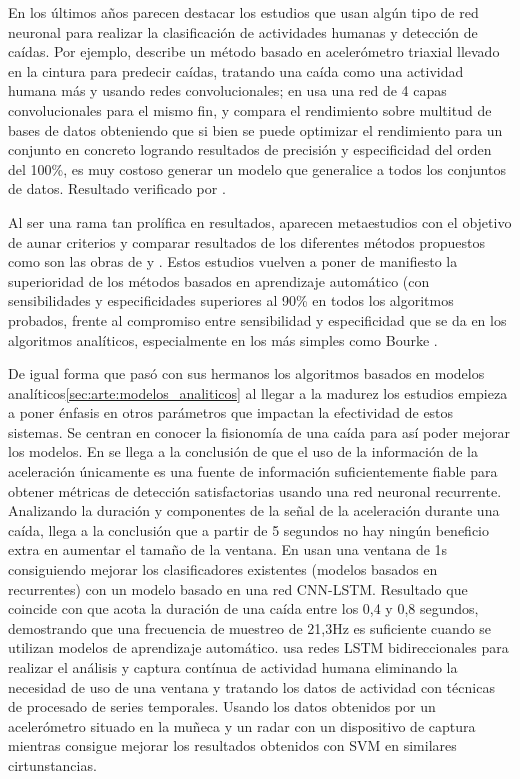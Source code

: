 En los últimos años parecen destacar los estudios que usan algún tipo de red neuronal \cite{Musci2020,Shi2020,Casilari2020,Liu2020} para realizar la clasificación de actividades humanas y detección de caídas. Por ejemplo,  describe un método basado en acelerómetro triaxial llevado en la cintura para predecir caídas, tratando una caída como una actividad humana más y usando redes convolucionales; en  usa una red de 4 capas convolucionales para el mismo fin, y compara el rendimiento sobre multitud de bases de datos obteniendo que si bien se puede optimizar el rendimiento para un conjunto en concreto logrando resultados de precisión y especificidad del orden del 100\%, es muy costoso generar un modelo que generalice a todos los conjuntos de datos. Resultado verificado por .

Al ser una rama tan prolífica en resultados, aparecen metaestudios con el objetivo de aunar criterios y comparar resultados de los diferentes métodos propuestos como son las obras de  y . Estos estudios vuelven a poner de manifiesto la superioridad de los métodos basados en aprendizaje automático (con sensibilidades y especificidades superiores al 90\% en todos los algoritmos probados, frente al compromiso entre sensibilidad y especificidad que se da en los algoritmos analíticos, especialmente en los más simples como Bourke \cite{Aziz2017}.

De igual forma que pasó con sus hermanos los algoritmos basados en modelos analíticos\ref{sec:arte:modelos_analiticos} al llegar a la madurez los estudios empieza a poner énfasis en otros parámetros que impactan la efectividad de estos sistemas. Se centran en conocer la fisionomía de una caída para así poder mejorar los modelos. En \cite[p.~6]{Musci2020} se llega a la conclusión de que el uso de la información de la aceleración únicamente es una fuente de información suficientemente fiable para obtener métricas de detección satisfactorias usando una red neuronal recurrente. Analizando la duración y componentes de la señal de la aceleración durante una caída,  llega a la conclusión que a partir de 5 segundos no hay ningún beneficio extra en aumentar el tamaño de la ventana. En \cite[p.~59]{Hassan2019} usan una ventana de 1s consiguiendo mejorar los clasificadores existentes (modelos basados en recurrentes) con un modelo basado en una red CNN-LSTM. Resultado que coincide con \cite[p.~2]{Liu2018} que acota la duración de una caída entre los 0,4 y 0,8 segundos, demostrando que una frecuencia de muestreo de 21,3Hz es suficiente cuando se utilizan modelos de aprendizaje automático.  usa redes LSTM bidireccionales para realizar el análisis y captura contínua de actividad humana eliminando la necesidad de uso de una ventana y tratando los datos de actividad con técnicas de procesado de series temporales. Usando los datos obtenidos por un acelerómetro situado en la muñeca y un radar con un dispositivo de captura  mientras consigue mejorar los resultados obtenidos con SVM en similares cirtunstancias\cite[p.~9]{Li2019}. 


